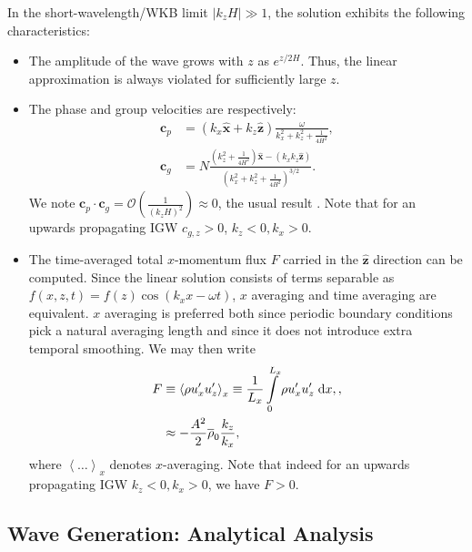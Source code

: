 \documentclass[
        fleqn,
        usenatbib,
    ]{mnras}
\newcommand*{\abs}[1]{\left|#1\right|}
\newcommand*{\ev}[1]{\left\langle#1\right\rangle}
\newcommand*{\p}[1]{\left(#1\right)}
\newcommand*{\bm}[1]{\boldsymbol{\mathbf{#1}}}
\newcommand*{\uv}[1]{\hat{\boldsymbol{\mathbf{#1}}}}
\begin{document}
In the short-wavelength/WKB limit $\abs{k_{z}H} \gg 1$, the solution exhibits
the following characteristics:
\begin{itemize}
    \item The amplitude of the wave grows with $z$ as $e^{z/2H}$. Thus, the
        linear approximation is always violated for sufficiently large $z$.

    \item The phase and group velocities are respectively:
        \begin{align}
            \bm{c}_{p} &=
                \p{k_{x}\uv{x} + k_{z}\uv{z}}\frac{\omega}
                {k_{x}^2 + k_{z}^2 + \frac{1}{4H^2}},\\
            \bm{c}_{g} &= N\frac{\p{k_{z}^2 + \frac{1}{4H^2}}\uv{x}
                - \p{k_{x}k_{z}\uv{z}}}
                {\p{k_{x}^2 + k_{z}^2 + \frac{1}{4H^2}}^{3/2}}.\label{eq:vg}
        \end{align}
        We note $\bm{c}_{p} \cdot \bm{c}_g =
        \mathcal{O}\p{\frac{1}{\p{k_{z}H}^{2}}} \approx 0$, the usual result
        \citep[e.g.][]{drazin,sutherland1}. Note that for an upwards
        propagating IGW $c_{g, z} > 0$, $k_z < 0, k_x > 0$.

    \item The time-averaged total $x$-momentum flux $F$ carried in the $\uv{z}$
        direction can be computed. Since the linear solution consists of terms
        separable as $f(x, z, t) = f(z)\cos\p{k_{x}x - \omega t}$, $x$
        averaging and time averaging are equivalent. $x$ averaging is preferred
        both since periodic boundary conditions pick a natural averaging length
        and since it does not introduce extra temporal smoothing. We may then
        write
        \begin{align}
            F &\equiv \ev{\rho u_{x}' u_{z}'}_x \equiv
                \frac{1}{L_x}\int_0^{L_x}\limits \rho u_{x}'u_{z}'\;\mathrm{d}x,
                    \label{eq:F_def},\\
                &\approx -\frac{A^2}{2}\overline{\rho}_0\frac{k_{z}}{k_{x}},
                    \label{eq:S_lin}
        \end{align}
        where $\ev{\dots}_x$ denotes $x$-averaging. Note that indeed for an
        upwards propagating IGW $k_z < 0, k_x > 0$, we have $F > 0$.
\end{itemize}

\subsection{Wave Generation: Analytical Analysis}
\end{document}
